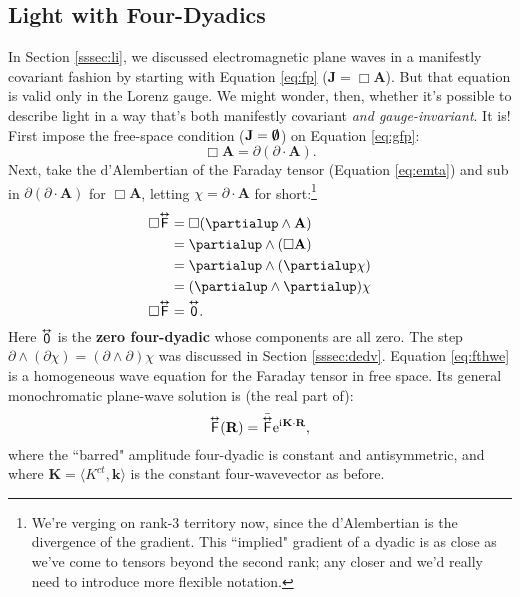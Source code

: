 \documentclass[12pt]{article}
\renewcommand{\vv}[1]{\mathbf{#1}}
\newcommand{\tightoverset}[2]{%
  \mathop{#2}\limits^{\vbox to -.5ex{\kern-0.75ex\hbox{$#1$}\vss}}}
\newcommand{\inlinedy}[1]{\tightoverset{\text{\tiny$\bm\leftrightarrow$}}{#1}}
\newcommand{\capdy}[1]{ \overset{ \text{\tiny$\bm\leftrightarrow$} }{\vphantom{\text{\small{A}}}\smash{#1}} }
\begin{document}
\subsection{Light with Four-Dyadics}

In Section \ref{sssec:li}, we discussed electromagnetic plane waves in a manifestly covariant fashion by starting with Equation \ref{eq:fp} ($\vv J = \Box \vv A$). But that equation is valid only in the Lorenz gauge. We might wonder, then, whether it's possible to describe light in a way that's both manifestly covariant \emph{and gauge-invariant}. It is! First impose the free-space condition ($\vv J = \textrm{\mbox{\boldmath $\emptyset$}}$) on Equation \ref{eq:gfp}:
\begin{equation*}
\Box \vv A = \partialup(\partialup \cdot \vv A).
\end{equation*}
Next, take the d'Alembertian of the Faraday tensor (Equation \ref{eq:emta}) and sub in $\partialup(\partialup \cdot \vv A)$ for $\Box \vv A$, letting $\chi = \partialup \cdot \vv A$ for short:\footnote{We're verging on rank-3 territory now, since the d'Alembertian is the divergence of the gradient. This ``implied" gradient of a dyadic is as close as we've come to tensors beyond the second rank; any closer and we'd really need to introduce more flexible notation.}
\begin{equation}\label{eq:fthwe}
\begin{split}
\Box \capdy{\mathsf{F}} &= \Box ( \partialup \wedge \vv A ) \\
&= \partialup \wedge ( \Box \vv A) \\
&= \partialup \wedge (\partialup \chi) \\
&= ( \partialup \wedge \partialup ) \chi \\
\Box \capdy{\mathsf{F}} &= \capdy{\mathsf{0}} .
\end{split}
\end{equation}
Here $\inlinedy{\mathsf{0}}$ is the \textbf{zero four-dyadic} whose components are all zero. The step $\partialup \wedge (\partialup \chi) = (\partialup \wedge \partialup) \chi$ was discussed in Section \ref{sssec:dedv}. Equation \ref{eq:fthwe} is a homogeneous wave equation for the Faraday tensor in free space. Its general monochromatic plane-wave solution is (the real part of):
\begin{equation}\label{eq:ftwe}
\capdy{\mathsf{F}} (\vv R) = \bar{\capdy{\mathsf{F}}} \mathrm{e}^{\mathrm{i} \mkern.5mu \vv K \cdot \vv R} ,
\end{equation}
where the ``barred" amplitude four-dyadic is constant and antisymmetric, and where $\vv K = \langle K^{ct}, \vv k \rangle$ is the constant four-wavevector as before.
\end{document}
